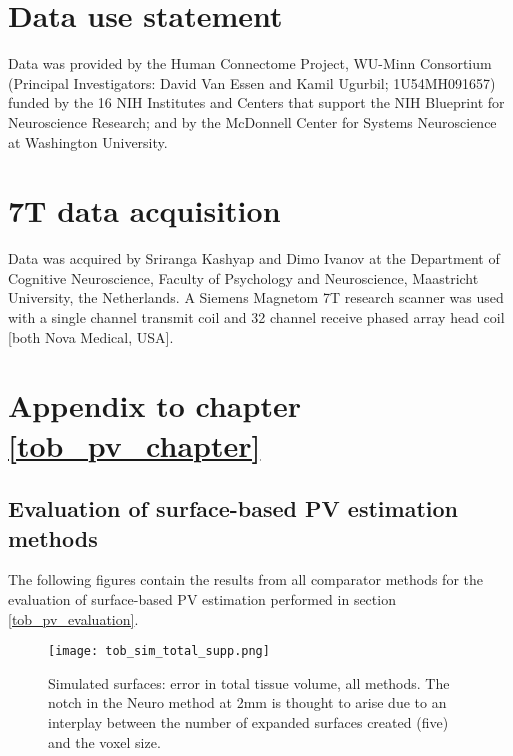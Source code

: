  

\begin{appendices}
\chapter{Data use statement}

Data was provided by the Human Connectome Project, WU-Minn Consortium (Principal Investigators: David Van Essen and Kamil Ugurbil; 1U54MH091657) funded by the 16 NIH Institutes and Centers that support the NIH Blueprint for Neuroscience Research; and by the McDonnell Center for Systems Neuroscience at Washington University.


\chapter{7T data acquisition}
\label{7T_appendix}

Data was acquired by Sriranga Kashyap and Dimo Ivanov at the Department of Cognitive Neuroscience, Faculty of Psychology and Neuroscience, Maastricht University, the Netherlands. A Siemens Magnetom 7T research scanner was used with a single channel transmit coil and 32 channel receive phased array head coil [both Nova Medical, USA]. 


  \chapter{Appendix to chapter \ref{tob_pv_chapter}}
  \section{Evaluation of surface-based PV estimation methods}
The following figures contain the results from all comparator methods for the evaluation of surface-based PV estimation performed in section \ref{tob_pv_evaluation}. 

\begin{figure}
\centering
\texttt{[image: tob\_sim\_total\_supp.png]}
\caption{Simulated surfaces: error in total tissue volume, all methods. The notch in the Neuro method at 2mm is thought to arise due to an interplay between the number of expanded surfaces created (five) and the voxel size. }
\label{tob_sim_total_supp}
\end{figure}


\end{appendices}
